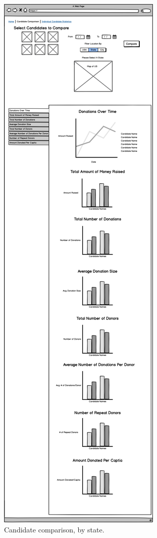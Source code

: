 \documentclass[12pt]{article}
\begin{document}
    \begin{figure}[H]
        \begin{center}
        \includegraphics[scale=.20]{candidatecompbystate}
        \caption{Candidate comparison, by state.}
        \label{fig:3}
        \end{center}
    \end{figure}
\end{document}
